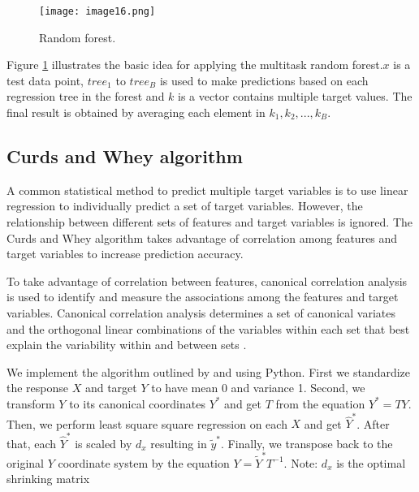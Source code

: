\documentclass{article}
\begin{document}
\begin{figure}[h]
  \centering
  \texttt{[image: image16.png]}
  \caption[Caption for LOF]{Random forest.\footnotemark}
  \label{forest}
\end{figure}

Figure \ref{forest} illustrates the basic idea for applying the multitask random forest.$x$ is a test data point, $tree_{1}$ to $tree_{B}$ is used to make predictions based on each regression tree in the forest and $k$ is a vector contains multiple target values. The final result is obtained by averaging each element in $k_{1}, k_{2},..., k_{B}$.


\subsection{Curds and Whey algorithm}

A common statistical method to predict multiple target variables is to use linear regression to individually predict a set of target variables. However, the relationship between different sets of features and target variables is ignored. The Curds and Whey algorithm takes advantage of correlation among features and target variables to increase prediction accuracy.

To take advantage of correlation between features, canonical correlation analysis is used to identify and measure the associations among the features and target variables. Canonical correlation analysis determines a set of canonical variates and the orthogonal linear combinations of the variables within each set that best explain the variability within and between sets \citep{kidd_implementation_2014}.

We implement the algorithm outlined by \citet{breiman_predicting_1997} and \citet{kidd_implementation_2014} using Python. First we standardize the response $X$ and target $Y$ to have mean 0 and variance 1. Second, we transform $Y$ to its canonical coordinates $Y^*$ and get $T$ from the equation $Y^* = TY$. Then, we perform least square square regression on each $X$ and get  $\widehat {Y}^*$.  After that, each $\widehat {Y}^*$ is scaled by $d_{x}$ resulting in $\widetilde{y}^*$.  Finally, we transpose back to the original $Y$ coordinate system by the equation $Y = \widetilde{Y}^* T^{-1}$. Note: $d_x$ is the optimal shrinking matrix
\end{document}

